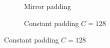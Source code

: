 \begin{figure}[h!]
\begin{subfigure}{0.25\textwidth}
  \caption{Mirror padding}
\end{subfigure}%
\begin{subfigure}{0.25\textwidth}
  \centering
  \caption{Constant padding $C = 128$}
\end{subfigure}%

\end{figure}
